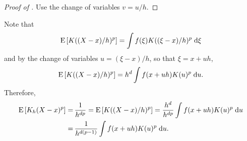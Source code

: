 \begin{proof}[Proof of ]
Use the change of variables \(v = u / h\).
\end{proof}

Note that
\begin{equation*}
  \mathrm{E} \left[ K ((X - x) / h)^{p} \right] = \int f (\xi) K ((\xi - x) / h)^{p} \;
  \mathrm{d} \xi
\end{equation*}
and by the change of variables \(u = (\xi - x) / h\), so that \(\xi = x + u h\),
\begin{equation*}
  \mathrm{E} \left[ K ((X - x) / h)^{p} \right] = h^{d} \int f (x + u h) K (u)^{p} \;
  \mathrm{d} u.
\end{equation*}
Therefore,
\begin{align*}
  \mathrm{E} \left[ K_{h} (X - x)^{p} \right] =
  & \, \frac{1}{h^{d p}} = \mathrm{E} \left[ K ((X - x) / h)^{p} \right] =
  \frac{h^{d}}{h^{d p}} \int f (x + u h) K (u)^{p} \; \mathrm{d} u \\
  =
  & \, \frac{1}{h^{d (p - 1)}} \int f (x + u h) K (u)^{p} \; \mathrm{d} u.
\end{align*}

